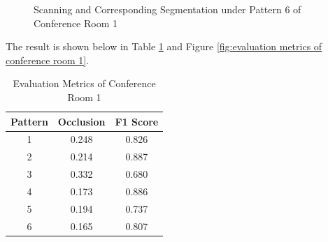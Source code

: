 \documentclass[11pt, a4paper,oneside,chapterprefix=false]{scrbook}
\begin{document}
\begin{figure}[H]
    \centering
      \label{fig:conf1 6 occluded} \hfill
     \label{fig:conf1 6 seg}
    \caption{Scanning and Corresponding Segmentation under Pattern 6 of Conference Room 1}
    \label{fig:conf1 6 occ and seg}
\end{figure}

The result is shown below in Table \ref{tab:evaluation metrics of conference room 1} and Figure \ref{fig:evaluation metrics of conference room 1}.

\begin{table}[H]
    \centering
    \begin{tabular}{|c|c|c|}
        \hline
        Pattern & Occlusion & F1 Score \\
        \hline
        1 & 0.248 & 0.826 \\
        2 & 0.214 & 0.887 \\
        3 & 0.332 & 0.680 \\
        4 & 0.173 & 0.886 \\
        5 & 0.194 & 0.737 \\
        6 & 0.165 & 0.807 \\
        \hline
    \end{tabular}
    \caption{Evaluation Metrics of Conference Room 1}
    \label{tab:evaluation metrics of conference room 1}
\end{table}
\end{document}

